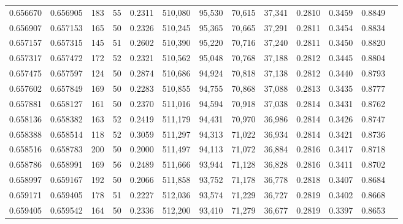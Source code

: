 \begin{tabular}{rrrrrrrrrrrrr}
0.656670 & 0.656905 &   183 &  55 &                                     0.2311 & 510,080 &  95,530 &  70,615 &  37,341 & 0.2810 & 0.3459 & 0.8849 \\
0.656907 & 0.657153 &   165 &  50 &                                     0.2326 & 510,245 &  95,365 &  70,665 &  37,291 & 0.2811 & 0.3454 & 0.8834 \\
0.657157 & 0.657315 &   145 &  51 &                                     0.2602 & 510,390 &  95,220 &  70,716 &  37,240 & 0.2811 & 0.3450 & 0.8820 \\
0.657317 & 0.657472 &   172 &  52 &                                     0.2321 & 510,562 &  95,048 &  70,768 &  37,188 & 0.2812 & 0.3445 & 0.8804 \\
0.657475 & 0.657597 &   124 &  50 &                                     0.2874 & 510,686 &  94,924 &  70,818 &  37,138 & 0.2812 & 0.3440 & 0.8793 \\
0.657602 & 0.657849 &   169 &  50 &                                     0.2283 & 510,855 &  94,755 &  70,868 &  37,088 & 0.2813 & 0.3435 & 0.8777 \\
0.657881 & 0.658127 &   161 &  50 &                                     0.2370 & 511,016 &  94,594 &  70,918 &  37,038 & 0.2814 & 0.3431 & 0.8762 \\
0.658136 & 0.658382 &   163 &  52 &                                     0.2419 & 511,179 &  94,431 &  70,970 &  36,986 & 0.2814 & 0.3426 & 0.8747 \\
0.658388 & 0.658514 &   118 &  52 &                                     0.3059 & 511,297 &  94,313 &  71,022 &  36,934 & 0.2814 & 0.3421 & 0.8736 \\
0.658516 & 0.658783 &   200 &  50 &                                     0.2000 & 511,497 &  94,113 &  71,072 &  36,884 & 0.2816 & 0.3417 & 0.8718 \\
0.658786 & 0.658991 &   169 &  56 &                                     0.2489 & 511,666 &  93,944 &  71,128 &  36,828 & 0.2816 & 0.3411 & 0.8702 \\
0.658997 & 0.659167 &   192 &  50 &                                     0.2066 & 511,858 &  93,752 &  71,178 &  36,778 & 0.2818 & 0.3407 & 0.8684 \\
0.659171 & 0.659405 &   178 &  51 &                                     0.2227 & 512,036 &  93,574 &  71,229 &  36,727 & 0.2819 & 0.3402 & 0.8668 \\
0.659405 & 0.659542 &   164 &  50 &                                     0.2336 & 512,200 &  93,410 &  71,279 &  36,677 & 0.2819 & 0.3397 & 0.8653 \\

\end{tabular}

